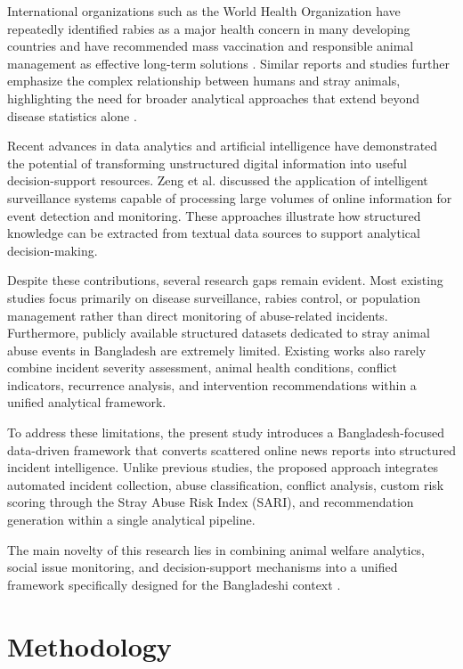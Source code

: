 \documentclass[conference]{IEEEtran}
\begin{document}
International organizations such as the World Health Organization have repeatedly identified rabies as a major health concern in many developing countries and have recommended mass vaccination and responsible animal management as effective long-term solutions \cite{who2024}. Similar reports and studies further emphasize the complex relationship between humans and stray animals, highlighting the need for broader analytical approaches that extend beyond disease statistics alone \cite{who2024,cdc2024,hampson2015}.

Recent advances in data analytics and artificial intelligence have demonstrated the potential of transforming unstructured digital information into useful decision-support resources. Zeng et al. \cite{zeng2020,brown2019,lee2021,wang2020} discussed the application of intelligent surveillance systems capable of processing large volumes of online information for event detection and monitoring. These approaches illustrate how structured knowledge can be extracted from textual data sources to support analytical decision-making.

Despite these contributions, several research gaps remain evident. Most existing studies focus primarily on disease surveillance, rabies control, or population management rather than direct monitoring of abuse-related incidents. Furthermore, publicly available structured datasets dedicated to stray animal abuse events in Bangladesh are extremely limited. Existing works also rarely combine incident severity assessment, animal health conditions, conflict indicators, recurrence analysis, and intervention recommendations within a unified analytical framework.

To address these limitations, the present study introduces a Bangladesh-focused data-driven framework that converts scattered online news reports into structured incident intelligence. Unlike previous studies, the proposed approach integrates automated incident collection, abuse classification, conflict analysis, custom risk scoring through the Stray Abuse Risk Index (SARI), and recommendation generation within a single analytical pipeline.

The main novelty of this research lies in combining animal welfare analytics, social issue monitoring, and decision-support mechanisms into a unified framework specifically designed for the Bangladeshi context \cite{chen2022,garcia2021,smith2023,jones2020,fernandez2023}.

\section{Methodology}
\end{document}
